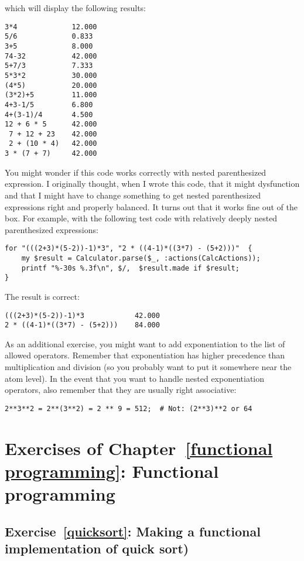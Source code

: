 which will display the following results:

\begin{verbatim}
3*4             12.000
5/6             0.833
3+5             8.000
74-32           42.000
5+7/3           7.333
5*3*2           30.000
(4*5)           20.000
(3*2)+5         11.000
4+3-1/5         6.800
4+(3-1)/4       4.500
12 + 6 * 5      42.000
 7 + 12 + 23    42.000
 2 + (10 * 4)   42.000
3 * (7 + 7)     42.000
\end{verbatim}

You might wonder if this code works correctly with nested 
parenthesized expression. I originally thought, when I wrote this 
code, that it might dysfunction and that I might have to change 
something to get nested parenthesized expressions right and 
properly balanced. It turns out that it works fine out of the 
box. For example, with the following test code with relatively 
deeply nested parenthesized expressions:

\begin{verbatim}
for "(((2+3)*(5-2))-1)*3", "2 * ((4-1)*((3*7) - (5+2)))"  { 
    my $result = Calculator.parse($_, :actions(CalcActions));
    printf "%-30s %.3f\n", $/,  $result.made if $result;
}
\end{verbatim}

The result is correct:
\begin{verbatim}
(((2+3)*(5-2))-1)*3            42.000
2 * ((4-1)*((3*7) - (5+2)))    84.000
\end{verbatim}

As an additional exercise, you might want to add exponentiation 
to the list of allowed operators. Remember that exponentiation has 
higher precedence than multiplication and division (so you probably 
want to put it somewhere near the atom level). In the event that 
you want to handle nested exponentiation operators, also 
remember that they are usually right associative:

\begin{verbatim}
2**3**2 = 2**(3**2) = 2 ** 9 = 512;  # Not: (2**3)**2 or 64
\end{verbatim}

\section{Exercises of Chapter~\ref{functional programming}: Functional programming}

\subsection{Exercise~\ref{quicksort}: Making a functional implementation of quick sort)}
\label{sol_quicksort}

